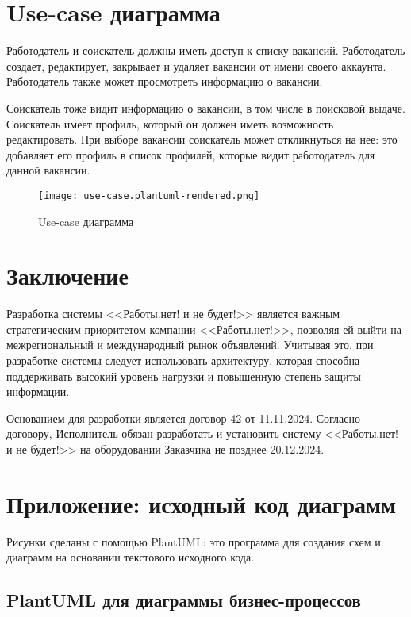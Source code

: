\documentclass[a4page]{article}
\begin{document}
\newpage
\section{Use-case диаграмма}

Работодатель и соискатель должны иметь доступ к списку вакансий.
Работодатель создает, редактирует, закрывает и удаляет вакансии от имени
своего аккаунта.
Работодатель также может просмотреть информацию о вакансии.

Соискатель тоже видит информацию о вакансии, в том числе в поисковой выдаче.
Соискатель имеет профиль, который он должен иметь возможность редактировать.
При выборе вакансии соискатель может откликнуться на нее:
это добавляет его профиль в список профилей, которые видит работодатель для данной вакансии.

\begin{figure}[H]
  \centering
  \texttt{[image: use-case.plantuml-rendered.png]}
  \caption{Use-case диаграмма}
\end{figure}

\newpage
\section{Заключение}

Разработка системы <<Работы.нет! и не будет!>> является важным стратегическим приоритетом компании <<Работы.нет!>>,
позволяя ей выйти на межрегиональный и международный рынок объявлений.
Учитывая это, при разработке системы следует использовать архитектуру, которая способна поддерживать высокий уровень нагрузки
и повышенную степень защиты информации.

Основанием для разработки является договор 42 от 11.11.2024.
Согласно договору, Исполнитель обязан разработать и установить систему <<Работы.нет! и не будет!>> на оборудовании Заказчика не позднее 20.12.2024.

\newpage
\section{Приложение: исходный код диаграмм}

Рисунки сделаны с помощью PlantUML: это программа для создания схем и диаграмм
на основании текстового исходного кода.

\subsection{PlantUML для диаграммы бизнес-процессов}
\end{document}
